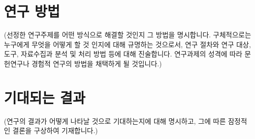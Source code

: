\documentclass{article}
\begin{document}
\section{연구 방법}
(선정한 연구주제를 어떤 방식으로
해결할 것인지 그 방법을 명시합니다. 구체적으로는 누구에게
무엇을 어떻게 할 것 인지에 대해 규명하는 것으로서,
연구 절차와 연구 대상, 도구, 자료수집과 분석 및 처리 방법 등에
대해 진술합니다. 연구과제의 성격에 따라 문헌연구나
경험적 연구의 방법을 채택하게 될 것입니다.)

\section{기대되는 결과}
(연구의 결과가 어떻게 나타날 것으로 기대하는지에
대해 명시하고, 그에 따른 잠정적인 결론을 구상하여 기재합니다.)



\end{document}
